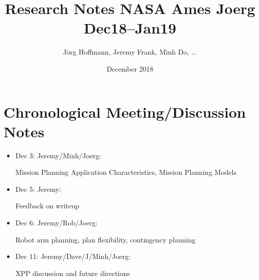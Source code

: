 \documentclass[fontsize=11pt]{scrartcl}
\title{Research Notes NASA Ames Joerg Dec18--Jan19}
\author{J\"org Hoffmann, Jeremy Frank, Minh Do, ... }
\date{December 2018}
\begin{document}
\maketitle





















\appendix

\section{Chronological Meeting/Discussion Notes}

\begin{itemize}
\item Dec 3: Jeremy/Minh/Joerg: 

    Mission Planning Application Characteristics, Mission Planning Models

\item Dec 5: Jeremy: 

    Feedback on writeup
    
\item Dec 6: Jeremy/Rob/Joerg: 

    Robot arm planning, plan flexibility, contingency planning
        
\item Dec 11: Jeremy/Dave/J/Minh/Joerg: 

    XPP discussion and future directions

\end{itemize}



\end{document}

